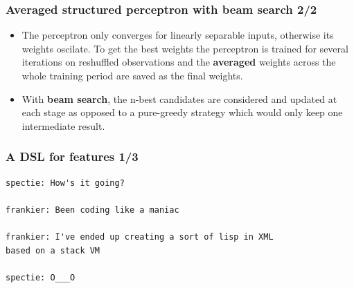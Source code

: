 \documentclass{beamer}
\begin{document}
\begin{frame}
\frametitle{Averaged structured perceptron with beam search 2/2}
\begin{itemize}

  \item The perceptron only converges for linearly separable inputs, otherwise
    its weights oscilate. To get the best weights the perceptron is trained for
    several iterations on reshuffled observations and the \textbf{averaged}
    weights across the whole training period are saved as the final weights.

  \item With \textbf{beam search}, the n-best candidates are considered and
    updated at each stage as opposed to a pure-greedy strategy which would only
    keep one intermediate result.

\end{itemize}
\end{frame}

{
\begin{frame}[plain]\end{frame}
}

\begin{frame}[fragile]
\frametitle{A DSL for features 1/3}

\begin{verbatim}
spectie: How's it going?

frankier: Been coding like a maniac

frankier: I've ended up creating a sort of lisp in XML
based on a stack VM

spectie: O___O
\end{verbatim}

\end{frame}
\end{document}
